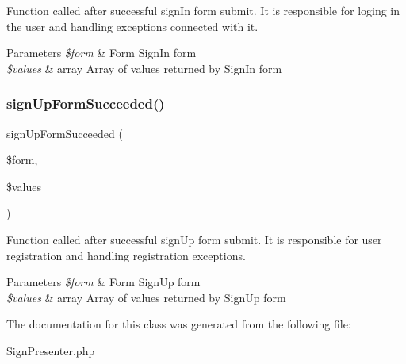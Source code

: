 Function called after successful sign\+In form submit. It is responsible for loging in the user and handling exceptions connected with it.


\begin{DoxyParams}{Parameters}
{\em \$form} & Form Sign\+In form \\
\hline
{\em \$values} & array Array of values returned by Sign\+In form \\
\hline
\end{DoxyParams}
\mbox{\label{class_app_1_1_presenters_1_1_sign_presenter_a0703a42cc6f7183e60d908e4e52cb6df}} 
\subsubsection{\texorpdfstring{sign\+Up\+Form\+Succeeded()}{signUpFormSucceeded()}}
{\footnotesize\ttfamily sign\+Up\+Form\+Succeeded (\begin{DoxyParamCaption}\item[{}]{\$form,  }\item[{}]{\$values }\end{DoxyParamCaption})}

Function called after successful sign\+Up form submit. It is responsible for user registration and handling registration exceptions.


\begin{DoxyParams}{Parameters}
{\em \$form} & Form Sign\+Up form \\
\hline
{\em \$values} & array Array of values returned by Sign\+Up form \\
\hline
\end{DoxyParams}


The documentation for this class was generated from the following file\+:\begin{DoxyCompactItemize}
\item 
Sign\+Presenter.\+php\end{DoxyCompactItemize}
